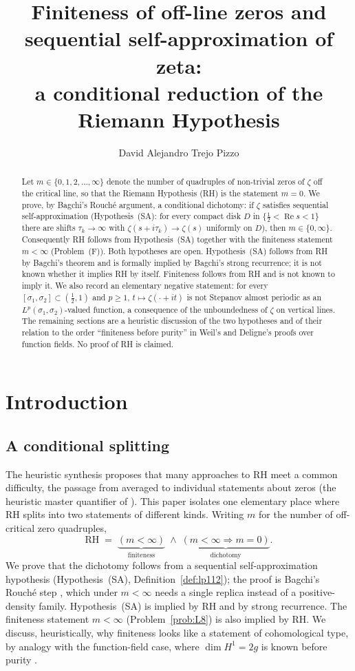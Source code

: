 \documentclass[11pt]{amsart}
\title[Finiteness and self-approximation]{Finiteness of off-line zeros and
sequential self-approximation of zeta:\\
a conditional reduction of the Riemann Hypothesis}
\author{David Alejandro Trejo Pizzo}
\theoremstyle{definition}
\theoremstyle{remark}
\newcommand{\RH}{\mathrm{RH}}
\DeclareMathOperator{\Real}{Re}
\begin{document}
\begin{abstract}
Let $m\in\{0,1,2,\dots,\infty\}$ denote the number of quadruples of
non-trivial zeros of $\zeta$ off the critical line, so that the Riemann
Hypothesis (RH) is the statement $m=0$. We prove, by Bagchi's Rouch\'e
argument, a conditional dichotomy: if $\zeta$ satisfies sequential
self-approximation (Hypothesis~(SA): for every compact disk $D$ in
$\{\tfrac12<\Real s<1\}$ there are shifts $\tau_k\to\infty$ with
$\zeta(s+i\tau_k)\to\zeta(s)$ uniformly on $D$), then $m\in\{0,\infty\}$.
Consequently RH follows from Hypothesis~(SA) together with the finiteness
statement $m<\infty$ (Problem~(F)). Both hypotheses are open. Hypothesis~(SA)
follows from RH by Bagchi's theorem and is formally implied by Bagchi's
strong recurrence; it is not known whether it implies RH by itself.
Finiteness follows from RH and is not known to imply it. We also record an
elementary negative statement: for every $[\sigma_1,\sigma_2]\subset
(\tfrac12,1)$ and $p\ge1$, $t\mapsto\zeta(\cdot+it)$ is not Stepanov almost
periodic as an $L^p(\sigma_1,\sigma_2)$-valued function, a consequence of the
unboundedness of $\zeta$ on vertical lines. The remaining sections are a
heuristic discussion of the two hypotheses and of their relation to the
order ``finiteness before purity'' in Weil's and Deligne's proofs over
function fields. No proof of RH is claimed.
\end{abstract}

\maketitle
\tableofcontents
\newpage

\section{Introduction}

\subsection{A conditional splitting}
The heuristic synthesis \cite{P29} proposes that many approaches to RH meet
a common difficulty, the passage from averaged to individual statements
about zeros (the heuristic master quantifier of
\cite[Principle~3.1]{P29}). This paper isolates one elementary place where
RH splits into two statements of different kinds. Writing $m$ for the number
of off-critical zero quadruples,
\[
\RH \;=\; \underbrace{(m<\infty)}_{\text{finiteness}}
\;\wedge\;
\underbrace{(m<\infty\Rightarrow m=0)}_{\text{dichotomy}}.
\]
We prove that the dichotomy follows from a sequential self-approximation
hypothesis (Hypothesis~(SA), Definition~\ref{def:lp112}); the proof is
Bagchi's Rouch\'e step \cite{Bagchi87}, which under $m<\infty$ needs a single
replica instead of a positive-density family. Hypothesis~(SA) is implied by
RH and by strong recurrence. The finiteness statement $m<\infty$
(Problem~\ref{prob:L8}) is also implied by RH. We discuss, heuristically,
why finiteness looks like a statement of cohomological type, by analogy with
the function-field case, where $\dim H^1=2g$ is known before purity
\cite{Weil49,Del74}.
\end{document}
